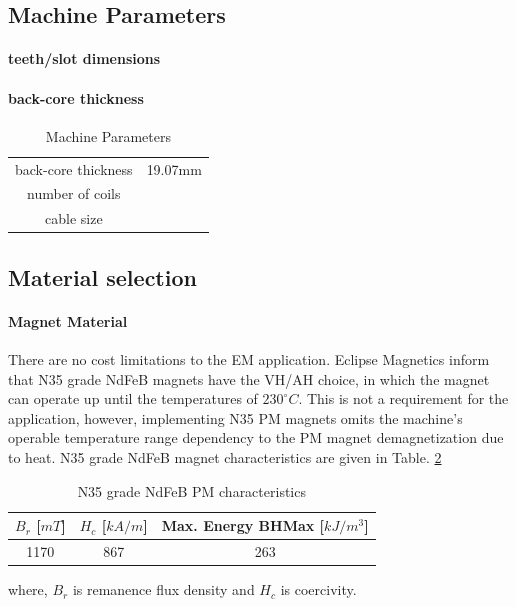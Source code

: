 \documentclass [a4 paper, 11pt, titlepage] {article}
\begin{document}
	
	
	
	
	\subsection{Machine Parameters}
	
	\paragraph{teeth/slot dimensions}
	
	\paragraph{back-core thickness}
		\begin{table}[h]
		\begin{center}
			\begin{tabular}{c|c}
				 &  \\
				\hline
				back-core thickness & 19.07mm \\
				number of coils & \\
				cable size & 
			\end{tabular}
		\end{center}
		\caption{Machine Parameters}
		\label{tab:machineParameters}
	\end{table}
	
	
	
	
	
	
	
	
	
	\subsection{Material selection}
	
	\paragraph{Magnet Material} There are no cost limitations to the EM application. Eclipse Magnetics inform that N35 grade NdFeB magnets have the VH/AH choice, in which the magnet can operate up until the temperatures of $230^{\circ}C$. This is not a requirement for the application, however, implementing N35 PM magnets omits the machine's operable temperature range dependency to the PM magnet demagnetization due to heat.
	N35 grade NdFeB magnet characteristics are given in Table. \ref{tab:N35}
	
	
	\begin{table}[h]
		\begin{center}
			\begin{tabular}{c|c|c}
				$B_r$ [$mT$] & $H_c$ [$kA/m$] & Max. Energy BHMax [$kJ/m^3$] \\
				\hline
				1170 & 867 & 263
			\end{tabular}
		\end{center}
		\caption{N35 grade NdFeB PM characteristics}
		\label{tab:N35}
	\end{table}
	where, $B_r$ is remanence flux density and $H_c$ is coercivity.
	
\end{document}
